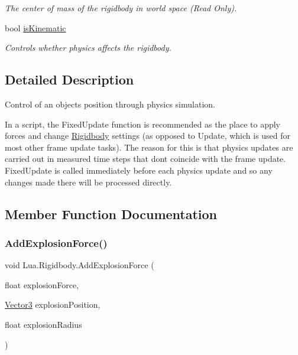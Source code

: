 \begin{DoxyCompactItemize}
\begin{DoxyCompactList}\small\item\em The center of mass of the rigidbody in world space (Read Only). \end{DoxyCompactList}\item 
bool \mbox{\hyperlink{class_lua_1_1_rigidbody_aee1018d4d56ab085d013acc494c0d0f9}{is\+Kinematic}}
\begin{DoxyCompactList}\small\item\em Controls whether physics affects the rigidbody. \end{DoxyCompactList}\end{DoxyCompactItemize}


\subsection{Detailed Description}
Control of an object\textquotesingle{}s position through physics simulation. 

In a script, the Fixed\+Update function is recommended as the place to apply forces and change \mbox{\hyperlink{class_lua_1_1_rigidbody}{Rigidbody}} settings (as opposed to Update, which is used for most other frame update tasks). The reason for this is that physics updates are carried out in measured time steps that don\textquotesingle{}t coincide with the frame update. Fixed\+Update is called immediately before each physics update and so any changes made there will be processed directly. 

\subsection{Member Function Documentation}
\mbox{\label{class_lua_1_1_rigidbody_a5d57a953b33d659f6e3b5508cd304960}} 
\subsubsection{\texorpdfstring{AddExplosionForce()}{AddExplosionForce()}}
{\footnotesize\ttfamily void Lua.\+Rigidbody.\+Add\+Explosion\+Force (\begin{DoxyParamCaption}\item[{float}]{explosion\+Force,  }\item[{\mbox{\hyperlink{class_lua_1_1_vector3}{Vector3}}}]{explosion\+Position,  }\item[{float}]{explosion\+Radius }\end{DoxyParamCaption})}



